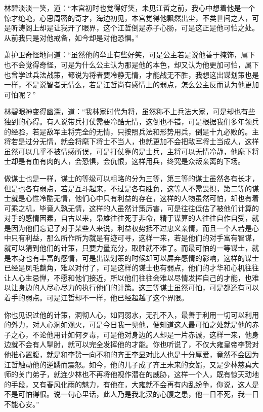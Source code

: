 林碧淡淡一笑，道：“本宫初时也觉得好笑，未见江哲之前，我心中想着他是一个惊才绝艳，心思周密的奇才，海边初见，本宫觉得他飘然出尘，不类世间之人，可是听涛阁上却是让我开了眼界，这个江哲倒是赤子心肠，可是这正是他可怕之处。从前我只是对他戒备，如今却是对他恐惧。”

萧护卫奇怪地问道：“虽然他的举止有些好笑，可是公主若是说他善于掩饰，属下也不会觉得奇怪，可是为什么公主认为那是他的本色，却又认为他更加可怕，属下也曾学过兵法战策，都说为将者要冷静无情，才能战无不胜，我想这出谋划策也是一样，不是说智者无情么，若是江哲尚有感情上的弱点，怎么公主反而认为他更加可怕呢？”

林碧眼神变得幽深，道：“我林家时代为将，虽然称不上兵法大家，可是却也有些独到的心得。有人说带兵打仗需要冷酷无情，这倒也不错，可是根据我们多年领兵的经验，若是敌军主将完全的无情，只按照兵法和形势用兵，倒是十九必败的。主将若是过分无情，就会将麾下将士不当人，也就更加不会把敌军将士当成人，这样虽然可以几乎不被情感所误，可是打仗靠的是士兵，主将可以无情冷静，他麾下将士却是有血有肉的人，会恐惧，会仇恨，这样用兵，终究是众叛亲离的下场。

做谋士也是一样，谋士的等级可以粗略的分为三等，第三等的谋士虽然各有长才，但是也各有弱点，若是互斗起来，不过是各有胜负，这等人不需畏惧，第二等的谋士就是心性冷酷无情，他们心中只有利益的存在，这样的人物虽然可怕，却也有着可乘之机，毕竟人孰无情，这样的人虽然计策厉害，可是往往低估了被他们计算的对手的感情因素，自古以来，枭雄往往死于非命，精于谋算的人往往自作自受，就是因为他们忘记了对于某些人来说，利益权势抵不过忠义亲情，而且一个人若是心中只有利益，那么所作所为就是有迹可寻，这样一来，若是他们的对手富有智谋，就可以猜到他们的计策，只要力量充分，取胜就不难了。而最可怕的一等谋士，就是本身也有丰富的感情，可是出谋划策的时候却可以屏弃感情的影响，这样的谋士已经是凤毛麟角，难以对付了，可是这样的谋士也有弱点，他们的才华和心机往往让人心生忌惮，不愿和他们接近，所以他们往往会难以尽情发挥自己的才能，也难以让身边的人尽心尽力的执行他们的计策。这三等谋士虽然可怕，可是都还有可以着手的弱点。可是江哲却不一样，他已经超越了这个界限。

你也见识过他的计策，洞彻人心，如同弱水，无孔不入，最善于利用一切可以利用的外力，对人心洞如观火，可是今日我一见他，便知道这人最可怕之处就是他的赤子之心，不论他用计如何歹毒，可是他对身边的人却是一片赤诚，这样一来，他身边就不会有人掣肘，就可以完全发挥他的才能。你也听说了，不仅大雍皇帝李贽对他推心置腹，就是和李贽一向不和的齐王李显对此人也是十分厚爱，竟然不会因为江哲触动他的逆鳞而震怒。如今，他的儿子成了齐王未来的女婿，又是少林慈真大师的关门弟子，就连少林也不再将他视作潜在的威胁，这样一个人，既有惊天动地的手段，又有春风化雨的魅力，有他在，大雍就不会再有内乱纷争，你说，这人是不是可怕得很。说一句心里话，此人乃是我北汉的心腹之患，他一日不死，我一日不能心安。”

